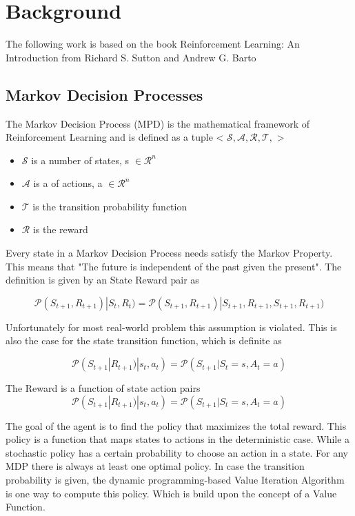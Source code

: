 \chapter{Background}\label{chap:background}
The following work is based on the book Reinforcement Learning:
An Introduction\cite{Sutton1998} from Richard S. Sutton and Andrew G. Barto
\section{Markov Decision Processes}
The Markov Decision Process (MPD)  is the mathematical framework of Reinforcement Learning and
is defined as a tuple < $\mathcal{S, A, R, T, }$ >
\begin{itemize}
\item $\mathcal{S}$ is a number of states, s $\in \mathcal{R}^{n}$
\item $\mathcal{A}$ is a of actions, a $ \in \mathcal{R}^{n}$
\item $\mathcal{T}$ is the transition probability function
\item $\mathcal{R}$ is the reward
\end{itemize}


Every state in a Markov Decision Process needs satisfy the Markov Property.
This means that "The future is independent of the past given the present".
The definition is given by an State Reward pair as 


\begin{equation}
\mathcal{P}(S_{t+1}, R_{t+1}) | S_{t}, R_{t}) =  \mathcal{P}(S_{t+1}, R_{t+1}) | S_{t+1}, R_{t+1}, S_{t+1}, R_{t+1})
\end{equation}

Unfortunately for most real-world problem this assumption is violated. This is also the case for the
state transition function, which is definite as

\begin{equation}
  \mathcal{P}(S_{t+1}| R_{t+1}) | s_{t}, a_{t}) =  \mathcal{P}(S_{t+1}| S_{t} = s ,  A_{t} = a)
\end{equation}
 
The Reward is a function of state action pairs
\begin{equation}
  \mathcal{P}(S_{t+1}| R_{t+1}) | s_{t}, a_{t}) =  \mathcal{P}(S_{t+1}| S_{t} = s ,  A_{t} = a)
\end{equation}
 
The goal of the agent is to find the policy that maximizes the total reward.
This policy is a function that maps states to actions in the deterministic case.
While a stochastic policy has a certain probability to choose an action in a state.
For any MDP there is always at least one optimal policy. 
In case the transition probability is given, the dynamic programming-based Value Iteration  Algorithm is one way to compute this policy.
Which is build upon the concept of a Value Function.


